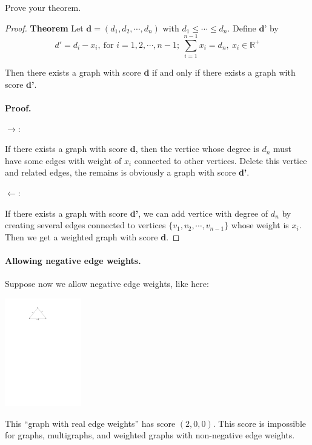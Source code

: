 \documentclass[12pt,a4]{article}
\begin{document}
\begin{exercise}
  Prove your theorem.
  \begin{proof}
  \textbf{Theorem}
  Let $\textbf{d}=(d_1,d_2,\cdots,d_n)$ with $d_1 \leq \cdots \leq d_n$. Define $\textbf{d'}$ by
  $$
  d'= d_i-x_i ,\ \text{for } i=1,2,\cdots,n-1; \ 
  \sum\limits_{i = 1}^{n-1}x_i = d_n,\ x_i \in \mathbb{R}^+
  $$

Then there exists a graph with score \textbf{d} if and only if there exists a graph with score \textbf{d'}.
\\
\\
\textbf{Proof.}
\item $\rightarrow$: \par
If there exists a graph with score \textbf{d}, then the vertice whose degree is $d_n$ must have some edges with weight of $x_i$ connected to other vertices. Delete this vertice and related edges, the remains is obviously a graph with score \textbf{d'}.
\item $\leftarrow$:	\par
If there exists a graph with score \textbf{d'},  we can add vertice with degree of $d_n$ by creating several edges connected to vertices $\{v_1, v_2, \cdots, v_{n-1}\}$ whose weight is $x_i$. Then we get a weighted graph with score \textbf{d}.
  \end{proof}
\end{exercise}

\paragraph{Allowing negative edge weights.} Suppose now we allow negative edge weights, like here:
\begin{center}
  \includegraphics[width=0.25\textwidth]{figures/arbitrary-weighted-graph-score.pdf}
\end{center}
This ``graph with real edge weights'' has score $(2,0,0)$. This score is impossible for
graphs, multigraphs, and weighted graphs with non-negative edge weights.
\end{document}
